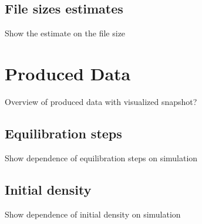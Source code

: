 \subsection{File sizes estimates}
\label{sec:file_size}
Show the estimate on the file size

\section{Produced Data}
\label{sec:data}
Overview of produced data with visualized snapshot?

\subsection{Equilibration steps}
\label{sec:eq_steps}
Show dependence of equilibration steps on simulation

\subsection{Initial density}
\label{sec:}
Show dependence of initial density on simulation


